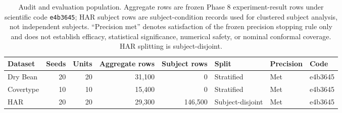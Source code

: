 \begin{table}[t]
\centering
\caption{Audit and evaluation population. Aggregate rows are frozen Phase 8 experiment-result rows under scientific code \texttt{e4b3645}; HAR subject rows are subject-condition records used for clustered subject analysis, not independent subjects. ``Precision met'' denotes satisfaction of the frozen precision stopping rule only and does not establish efficacy, statistical significance, numerical safety, or nominal conformal coverage. HAR splitting is subject-disjoint.}
\label{tab:t1-design-audit}
\small
\begin{tabular}{lrrrrlll}
\hline
Dataset & Seeds & Units & Aggregate rows & Subject rows & Split & Precision & Code \\
\hline
Dry Bean & 20 & 20 & 31,100 & 0 & Stratified & Met & e4b3645 \\
Covertype & 10 & 10 & 15,400 & 0 & Stratified & Met & e4b3645 \\
HAR & 20 & 20 & 29,300 & 146,500 & Subject-disjoint & Met & e4b3645 \\
\hline
\end{tabular}
\end{table}
